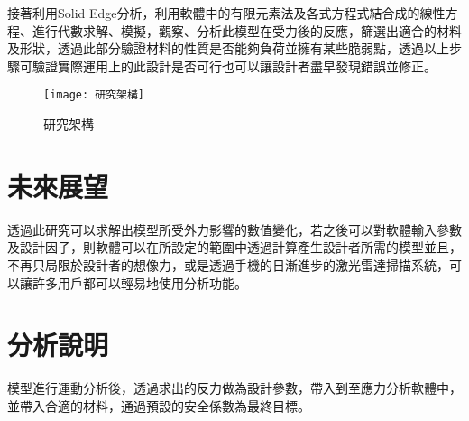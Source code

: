 接著利用Solid Edge分析，利用軟體中的有限元素法及各式方程式結合成的線性方程、進行代數求解、模擬，觀察、分析此模型在受力後的反應，篩選出適合的材料及形狀，透過此部分驗證材料的性質是否能夠負荷並擁有某些脆弱點，透過以上步驟可驗證實際運用上的此設計是否可行也可以讓設計者盡早發現錯誤並修正。\\

\begin{figure}[hbt!]
\begin{center}
\texttt{[image: 研究架構]}
\caption{\Large 研究架構 }
\label{研究架構 }
\end{center}
\end{figure}
\section{未來展望}

透過此研究可以求解出模型所受外力影響的數值變化，若之後可以對軟體輸入參數及設計因子，則軟體可以在所設定的範圍中透過計算產生設計者所需的模型並且，不再只局限於設計者的想像力，或是透過手機的日漸進步的激光雷達掃描系統，可以讓許多用戶都可以輕易地使用分析功能。\\
\section{分析說明}

模型進行運動分析後，透過求出的反力做為設計參數，帶入到至應力分析軟體中，並帶入合適的材料，通過預設的安全係數為最終目標。\\

\renewcommand{\baselinestretch}{0.5} %
